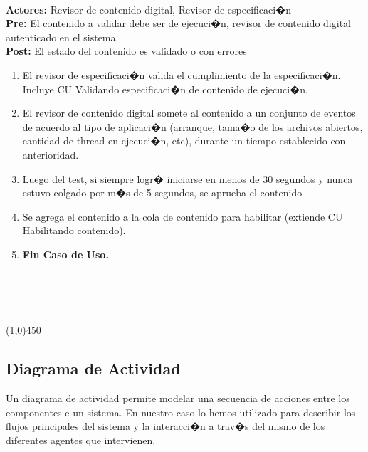 \documentclass[11pt, a4paper, spanish]{article}
\begin{document}
{ \\ \textbf{Actores:} Revisor de contenido digital, Revisor de especificaci�n \\ \textbf{Pre:} El contenido a validar debe ser de ejecuci�n, revisor de contenido digital autenticado en el sistema \\ \textbf{Post:} El estado del contenido es validado o con errores\\  \begin{enumerate} \item El revisor de especificaci�n valida el cumplimiento de la especificaci�n. Incluye CU Validando especificaci�n de contenido de ejecuci�n. \item El revisor de contenido digital somete al contenido a un conjunto de eventos de acuerdo al tipo de aplicaci�n (arranque, tama�o de los archivos abiertos, cantidad de thread en ejecuci�n, etc), durante un tiempo establecido con anterioridad. \item Luego del test, si siempre logr� iniciarse en menos de 30 segundos y nunca estuvo colgado por m�s de 5 segundos, se aprueba el contenido \item Se agrega el contenido a la cola de contenido para habilitar (extiende CU Habilitando contenido). \item \textbf{Fin Caso de Uso.} \end{enumerate}  \\ \\ \\ \begin{center} \line(1,0){450} \end{center}


\newpage

\subsection{Diagrama de Actividad}

	Un diagrama de actividad permite modelar una secuencia de acciones entre los componentes e un sistema. En nuestro caso lo hemos utilizado para 
describir los flujos principales del sistema y la interacci�n a trav�s del mismo de los diferentes agentes que intervienen.\\

}
\end{document}
